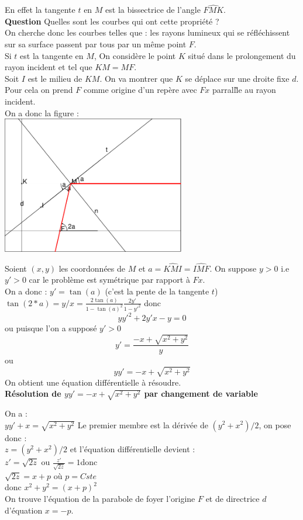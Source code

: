 \documentclass[a4paper,11pt]{book}
\begin{document}
En effet la tangente $t$ en $M$ est la bissectrice de l'angle $\widehat{FMK}$.\\
 {\bf Question}
Quelles sont les courbes qui ont cette propri\'et\'e ? \\
On cherche donc les courbes telles que :
les rayons lumineux qui se r\'efl\'echissent sur sa surface 
passent par tous par un m\^eme point $F$.\\
Si $t$ est la tangente en $M$, On consid\`ere le point $K$ situ\'e dans le 
prolongement du rayon incident et tel que $KM=MF$.\\
Soit $I$ est le milieu de $KM$. On va montrer que $K$ se d\'eplace sur une 
droite fixe $d$. Pour cela on prend 
$F$ comme origine d'un rep\`ere avec $Fx$ parrall\`le au rayon incident.\\
On a donc la figure :\\

\includegraphics[width=8cm]{parabole0}

Soient $(x,y)$ les coordonn\'ees de $M$ et $a=\widehat{KMI}=\widehat{IMF}$.
On suppose $y>0$ i.e $y'>0$ car le probl\`eme est sym\'etrique par rapport 
\`a $Fx$.\\
On a donc :
$y'=\tan(a)$ (c'est la pente de la tangente $t$)\\
$\tan(2*a)=y/x=\frac{2\tan(a)}{1-\tan(a)^2}\frac{2y'}{1-y'^2}$ 
donc
$$yy'^2+2y'x-y=0$$
ou puisque l'on a suppos\'e $y'>0$
$$y'=\frac{-x+\sqrt{x^2+y^2}}{y}$$
ou
$$yy'=-x+\sqrt{x^2+y^2}$$
On obtient une \'equation diff\'erentielle \`a r\'esoudre.\\

{\bf R\'esolution de $yy'=-x+\sqrt{x^2+y^2}$ par changement de variable}

On a :\\
$yy'+x=\sqrt{x^2+y^2}$
Le premier membre est la d\'eriv\'ee de $(y^2+x^2)/2$, on pose donc :\\
$z=(y^2+x^2)/2$ et l'\'equation diff\'erentielle devient :\\
$z'=\sqrt{2z}$ ou $\frac{z'}{\sqrt{2z}}=1$donc \\
$\sqrt{2z}=x+p$ o\`u $p=Cste$\\
donc $x^2+y^2=(x+p)^2$\\
On trouve l'\'equation de la parabole de foyer l'origine $F$ et de directrice 
$d$ d'\'equation $x=-p$.\\
\end{document}
